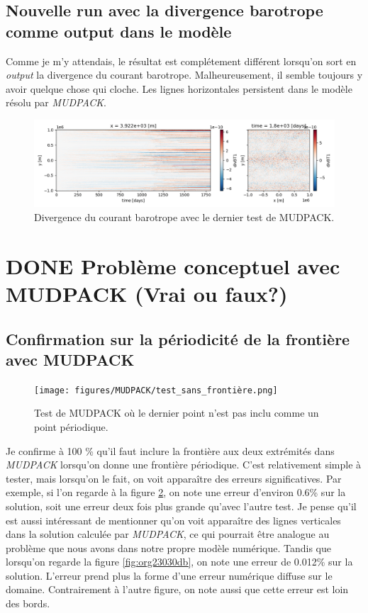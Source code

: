 \documentclass[10pt]{article}
\numberwithin{equation}{section}
\begin{document}
\subsection{Nouvelle run avec la divergence barotrope comme output dans le modèle}
\label{sec:org88ba147}

Comme je m'y attendais, le résultat est complétement différent lorsqu'on sort en \emph{output} la divergence du courant barotrope.
Malheureusement, il semble toujours y avoir quelque chose qui cloche.
Les lignes horizontales persistent dans le modèle résolu par \emph{MUDPACK}.

\begin{figure}[!htpb]
\centering
\includegraphics[width=.9\linewidth]{figures/debuggage/2023_07_03_comp_divBT.png}
\caption{\label{fig:org8a0afa1}Divergence du courant barotrope avec le dernier test de MUDPACK.}
\end{figure}





\section{{\bfseries\sffamily DONE} Problème conceptuel avec MUDPACK (Vrai ou faux?)}
\label{sec:orgcfbdaec}

\subsection{Confirmation sur la périodicité de la frontière avec MUDPACK}
\label{sec:org30e27cc}

\begin{figure}[!htpb]
\centering
\texttt{[image: figures/MUDPACK/test\_sans\_frontière.png]}
\caption{\label{fig:orga5d36be}Test de MUDPACK où le dernier point n'est pas inclu comme un point périodique.}
\end{figure}

Je confirme à 100 \% qu'il faut inclure la frontière aux deux extrémités dans \emph{MUDPACK} lorsqu'on donne une frontière périodique.
C'est relativement simple à tester, mais lorsqu'on le fait, on voit apparaître des erreurs significatives.
Par exemple, si l'on regarde à la figure \ref{fig:orga5d36be}, on note une erreur d'environ 0.6\% sur la solution, soit une erreur deux fois plus grande qu'avec l'autre test.
Je pense qu'il est aussi intéressant de mentionner qu'on voit apparaître des lignes verticales dans la solution calculée par \emph{MUDPACK}, ce qui pourrait être analogue au problème que nous avons dans notre propre modèle numérique. 
Tandis que lorsqu'on regarde la figure \ref{fig:org23030db}, on note une erreur de 0.012\% sur la solution.
L'erreur prend plus la forme d'une erreur numérique diffuse sur le domaine.
Contrairement à l'autre figure, on note aussi que cette erreur est loin des bords. \bigskip
\end{document}
